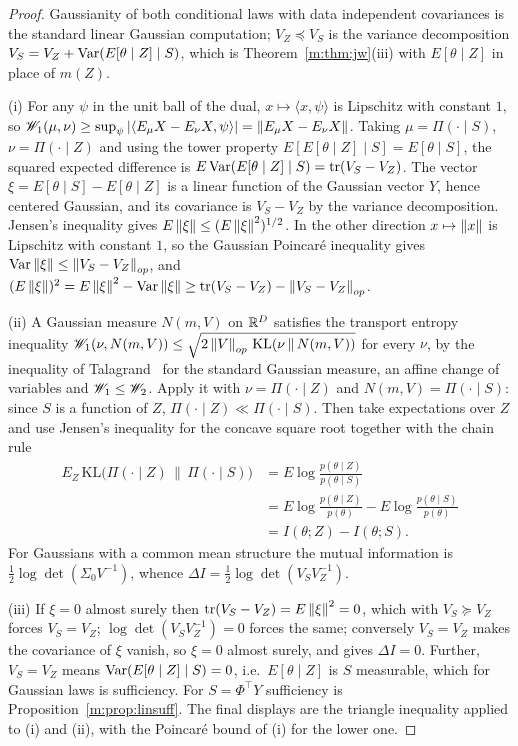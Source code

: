 \begin{proof}
Gaussianity of both conditional laws with data independent covariances is the standard linear Gaussian computation; $V_Z\preceq V_S$ is the variance decomposition $V_S=V_Z+\mathrm{Var}(E[\theta\mid Z]\mid S)$, which is Theorem~\ref{m:thm:jw}(iii) with $E[\theta\mid Z]$ in place of $m(Z)$.

(i) For any $\psi$ in the unit ball of the dual, $x\mapsto\langle x,\psi\rangle$ is Lipschitz with constant $1$, so $\mathscr{W}_1(\mu,\nu)\ge\sup_\psi|\langle E_\mu X-E_\nu X,\psi\rangle|=\left\|E_\mu X-E_\nu X\right\|$. Taking $\mu=\Pi(\cdot\mid S)$, $\nu=\Pi(\cdot\mid Z)$ and using the tower property $E[E[\theta\mid Z]\mid S]=E[\theta\mid S]$, the squared expected difference is $E\,\mathrm{Var}(E[\theta\mid Z]\mid S)=\mathrm{tr}(V_S-V_Z)$. The vector $\xi=E[\theta\mid S]-E[\theta\mid Z]$ is a linear function of the Gaussian vector $Y$, hence centered Gaussian, and its covariance is $V_S-V_Z$ by the variance decomposition. Jensen's inequality gives $E\left\|\xi\right\|\le(E\left\|\xi\right\|^2)^{1/2}$. In the other direction $x\mapsto\left\|x\right\|$ is Lipschitz with constant $1$, so the Gaussian Poincar\'e inequality gives $\mathrm{Var}\left\|\xi\right\|\le\left\|V_S-V_Z\right\|_{op}$, and $(E\left\|\xi\right\|)^2=E\left\|\xi\right\|^2-\mathrm{Var}\left\|\xi\right\|\ge\mathrm{tr}(V_S-V_Z)-\left\|V_S-V_Z\right\|_{op}$.

(ii) A Gaussian measure $N(m,V)$ on $\mathbb{R}^D$ satisfies the transport entropy inequality $\mathscr{W}_1(\nu,N(m,V))\le\sqrt{2\left\|V\right\|_{op}\,\mathrm{KL}(\nu\,\|\,N(m,V))}$ for every $\nu$, by the inequality of Talagrand~\cite{talagrand1996} for the standard Gaussian measure, an affine change of variables and $\mathscr{W}_1\le\mathscr{W}_2$. Apply it with $\nu=\Pi(\cdot\mid Z)$ and $N(m,V)=\Pi(\cdot\mid S)$: since $S$ is a function of $Z$, $\Pi(\cdot\mid Z)\ll\Pi(\cdot\mid S)$. Then take expectations over $Z$ and use Jensen's inequality for the concave square root together with the chain rule
\[
\begin{aligned}
E_Z\,\mathrm{KL}\big(\Pi(\cdot\mid Z)\,\|\,\Pi(\cdot\mid S)\big)&=E\log\frac{p(\theta\mid Z)}{p(\theta\mid S)}\\
&=E\log\frac{p(\theta\mid Z)}{p(\theta)}-E\log\frac{p(\theta\mid S)}{p(\theta)}\\
&=I(\theta;Z)-I(\theta;S).
\end{aligned}
\]
For Gaussians with a common mean structure the mutual information is $\tfrac12\log\det(\Sigma_0V^{-1})$, whence $\Delta I=\tfrac12\log\det(V_SV_Z^{-1})$.

(iii) If $\xi=0$ almost surely then $\mathrm{tr}(V_S-V_Z)=E\left\|\xi\right\|^2=0$, which with $V_S\succeq V_Z$ forces $V_S=V_Z$; $\log\det(V_SV_Z^{-1})=0$ forces the same; conversely $V_S=V_Z$ makes the covariance of $\xi$ vanish, so $\xi=0$ almost surely, and gives $\Delta I=0$. Further, $V_S=V_Z$ means $\mathrm{Var}(E[\theta\mid Z]\mid S)=0$, i.e.\ $E[\theta\mid Z]$ is $S$ measurable, which for Gaussian laws is sufficiency. For $S=\Phi^\top Y$ sufficiency is Proposition~\ref{m:prop:linsuff}. The final displays are the triangle inequality applied to (i) and (ii), with the Poincar\'e bound of (i) for the lower one.
\end{proof}

